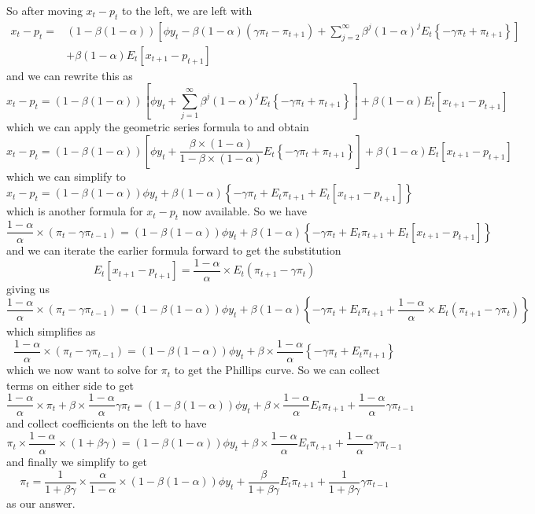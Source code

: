 \documentclass[11pt]{amsart}
\begin{document}
So after moving $x_t - p_t$ to the left, we are left with
\begin{align*}
x_t - p_t = &(1 - \beta (1-\alpha)) \left[\phi y_t - \beta (1-\alpha) (\gamma \pi_{t} - \pi_{t+1}) + \sum_{j=2}^{\infty} \beta^j (1-\alpha)^j E_t \left\{ - \gamma \pi_t  + \pi_{t+1} \right\} \right] \\ &+ \beta (1-\alpha) E_t [x_{t+1} - p_{t+1}]
\end{align*}
and we can rewrite this as
\[
x_t - p_t = (1 - \beta (1-\alpha)) \left[\phi y_t + \sum_{j=1}^{\infty} \beta^j (1-\alpha)^j E_t \left\{ - \gamma \pi_t  + \pi_{t+1} \right\} \right] + \beta (1-\alpha) E_t [x_{t+1} - p_{t+1}]
\]
which we can apply the geometric series formula to and obtain
\[
x_t - p_t = (1 - \beta (1-\alpha)) \left[\phi y_t + \frac{\beta \times (1-\alpha)}{1 - \beta \times (1-\alpha)} E_t \left\{ - \gamma \pi_t  + \pi_{t+1} \right\} \right] + \beta (1-\alpha) E_t [x_{t+1} - p_{t+1}]
\]
which we can simplify to 
\[
x_t - p_t = (1 - \beta (1-\alpha)) \phi y_t + \beta (1-\alpha) \left\{ - \gamma \pi_t + E_t \pi_{t+1} + E_t [x_{t+1} - p_{t+1}] \right\}
\]
which is another formula for $x_t - p_t$ now available. So we have
\[
 \frac{1-\alpha}{\alpha} \times (\pi_t - \gamma \pi_{t-1}) = (1 - \beta (1-\alpha)) \phi y_t + \beta (1-\alpha) \left\{ - \gamma \pi_t + E_t \pi_{t+1} + E_t [x_{t+1} - p_{t+1}] \right\}
\]
and we can iterate the earlier formula forward to get the substitution
\[
E_t[x_{t+1} - p_{t+1}] = \frac{1-\alpha}{\alpha} \times E_t(\pi_{t+1} - \gamma \pi_{t})
\]
giving us
\[
 \frac{1-\alpha}{\alpha} \times (\pi_t - \gamma \pi_{t-1}) = (1 - \beta (1-\alpha)) \phi y_t + \beta (1-\alpha) \left\{ - \gamma \pi_t + E_t \pi_{t+1} + \frac{1-\alpha}{\alpha} \times E_t(\pi_{t+1} - \gamma \pi_{t}) \right\}
\]
which simplifies as
\[
\frac{1-\alpha}{\alpha} \times (\pi_t - \gamma \pi_{t-1}) = (1 - \beta (1-\alpha)) \phi y_t + \beta \times \frac{1-\alpha}{\alpha} \left\{ - \gamma \pi_t + E_t \pi_{t+1} \right\}
\]
which we now want to solve for $\pi_t$ to get the Phillips curve.
So we can collect terms on either side to get
\[
\frac{1-\alpha}{\alpha} \times \pi_t + \beta \times \frac{1-\alpha}{\alpha} \gamma \pi_t = (1 - \beta (1-\alpha)) \phi y_t + \beta \times \frac{1-\alpha}{\alpha} E_t \pi_{t+1} + \frac{1-\alpha}{\alpha} \gamma \pi_{t-1}
\]
and collect coefficients on the left to have
\[
\pi_t \times \frac{1-\alpha}{\alpha} \times (1 + \beta \gamma) = (1 - \beta (1-\alpha)) \phi y_t + \beta \times \frac{1-\alpha}{\alpha} E_t \pi_{t+1} + \frac{1-\alpha}{\alpha} \gamma \pi_{t-1}
\]
and finally we simplify to get
\[
\pi_t = \frac{1}{1 + \beta \gamma}  \times \frac{\alpha}{1-\alpha} \times (1 - \beta (1-\alpha)) \phi y_t + \frac{\beta}{1 + \beta \gamma}E_t \pi_{t+1} +  \frac{1}{1 + \beta \gamma} \gamma \pi_{t-1}
\]
as our answer.
\end{document}
